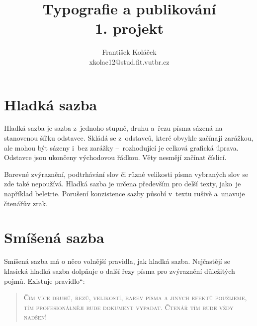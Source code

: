 \documentclass[a4paper, 11pt, twocolumn]{article}
\providecommand{\uv}[1]{\quotedblbase #1\textquotedblleft}
\begin{document}
\title{Typografie a publikování \\1. projekt}
\author{František Koláček\\xkolac12@stud.fit.vutbr.cz}
\date{}

\maketitle

\section{Hladká sazba}
\label{sec:Hladká sazba}
Hladká sazba je sazba z~jednoho stupně, druhu a~řezu písma sázená na stanovenou šířku odstavce. Skládá se z~odstavců, které obvykle začínají za\-ráž\-kou, ale mohou být sázeny i~bez zarážky --\ roz\-ho\-du\-jí\-cí je celková grafická úprava. Odstavce jsou ukončeny východovou řádkou. Věty nesmějí za\-čí\-nat číslicí.

Barevné zvýraznění, podtrhávání slov či různé velikosti písma vybraných slov se zde také nepoužívá. Hladká sazba je určena především pro delší texty, jako~je například beletrie. Porušení kon\-zi\-sten\-ce sazby působí v~textu rušivě a~unavuje čte\-ná\-řův zrak.

\section{Smíšená sazba}
\label{sec:Smíšená sazba}
Smíšená sazba má o něco volnější pravidla, jak hladká sazba. Nejčastějí se klasická hladká sazba dolpňuje o další řezy písma pro zvýraznění důležitých pojmů. Existuje \uv{pravidlo}:

\begin{quotation}

\textsc{Čím více druhů, řezů, velikostí, barev písma a jiných efektů použije\-me, tím profesionálněji bude dokument vypadat. Čtenář tím bude vždy nadšen!}

\end{quotation}
\end{document}
